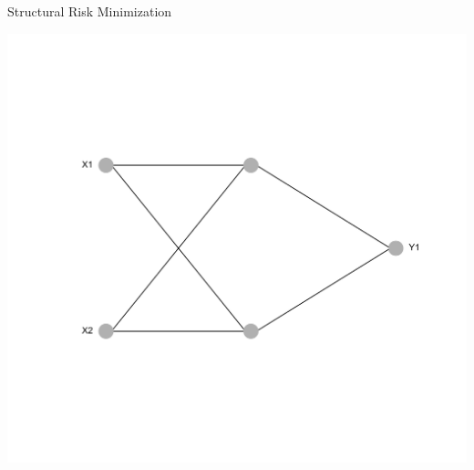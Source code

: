 \documentclass[11pt,compress,t,notes=noshow, xcolor=table]{beamer}
\begin{document}
\begin{frame} {Structural Risk Minimization}
{\begin{center}
\begin{minipage}{0.5\textwidth}
\end{minipage}%
\begin{minipage}{0.5\textwidth}
\includegraphics[width=\linewidth]{figure/nn_size_2.png}
\end{minipage}
\end{center}
}
\end{frame}
\end{document}
